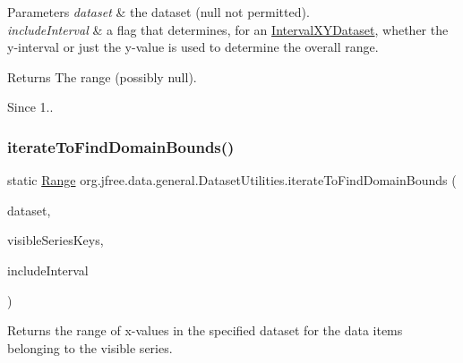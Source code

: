 \begin{DoxyParams}{Parameters}
{\em dataset} & the dataset ({\ttfamily null} not permitted). \\
\hline
{\em include\+Interval} & a flag that determines, for an \mbox{\hyperlink{}{Interval\+X\+Y\+Dataset}}, whether the y-\/interval or just the y-\/value is used to determine the overall range.\\
\hline
\end{DoxyParams}
\begin{DoxyReturn}{Returns}
The range (possibly {\ttfamily null}).
\end{DoxyReturn}
\begin{DoxySince}{Since}
1.. 
\end{DoxySince}
\mbox{\label{classorg_1_1jfree_1_1data_1_1general_1_1_dataset_utilities_a3293480f534c2444345c1cf3bb6b6640}} 
\subsubsection{\texorpdfstring{iterate\+To\+Find\+Domain\+Bounds()}{iterateToFindDomainBounds()}}
{\footnotesize\ttfamily static \mbox{\hyperlink{classorg_1_1jfree_1_1data_1_1_range}{Range}} org.\+jfree.\+data.\+general.\+Dataset\+Utilities.\+iterate\+To\+Find\+Domain\+Bounds (\begin{DoxyParamCaption}\item[{\mbox{\hyperlink{interfaceorg_1_1jfree_1_1data_1_1xy_1_1_x_y_dataset}{X\+Y\+Dataset}}}]{dataset,  }\item[{List}]{visible\+Series\+Keys,  }\item[{boolean}]{include\+Interval }\end{DoxyParamCaption})\hspace{0.3cm}{\ttfamily [static]}}

Returns the range of x-\/values in the specified dataset for the data items belonging to the visible series.


